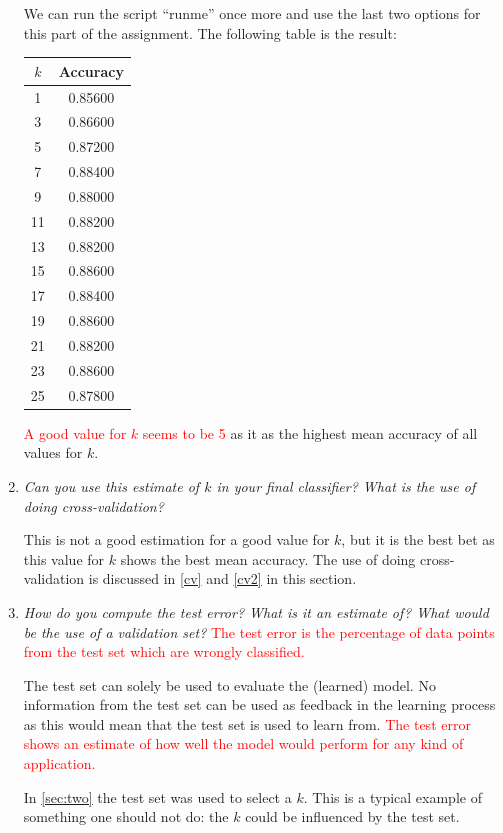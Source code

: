 \documentclass[a4paper,11pt]{article}
\newcommand{\highlightColor}{red}
\begin{document}
\begin{enumerate}
We can run the script ``runme'' once more and use the last two options for 
this part of the assignment.  The following table is the result:

\begin{tabular}{c | c}
\textbf{$k$} & \textbf{Accuracy} \\
\hline
1 &  0.85600\\ 
3 &  0.86600\\ 
5 &  0.87200\\ 
7 &  0.88400\\ 
9 &  0.88000\\ 
11&  0.88200\\ 
13&  0.88200\\ 
15&  0.88600\\ 
17&  0.88400\\ 
19&  0.88600\\ 
21&  0.88200\\ 
23&  0.88600\\ 
25&  0.87800\\ 
\end{tabular}

\textcolor{\highlightColor}{A good value for $k$ seems to be 5} as it as the highest mean accuracy of all
values for $k$.  

\item \textit{Can you use this estimate of $k$ in your final classifier? What is the use of doing cross-validation?}

This is not a good estimation for a good value for $k$, but it is the best 
bet as this value for $k$ shows the best mean accuracy.  The use of doing 
cross-validation is discussed in \autoref{cv} and \autoref{cv2} in this section.  

\item \textit{ How do you compute the test error? What is it an estimate of? What would be the use of a validation
set? } 
\label{cv2}
\textcolor{\highlightColor}{The test error is the percentage of data points from the test set which 
are wrongly classified.}

The test set can solely be used to evaluate the (learned) model.  No
information from the test set can be used as feedback in the learning 
process as this would mean that the test set is used to learn from.  
\textcolor{\highlightColor}{The 
test error shows an estimate of how well the model would perform for
any kind of application.}

In \autoref{sec:two} the test set was used to select a $k$.  This is a
typical example of something one should not do: the $k$ could be influenced
by the test set.  


\end{enumerate}
\end{document}
